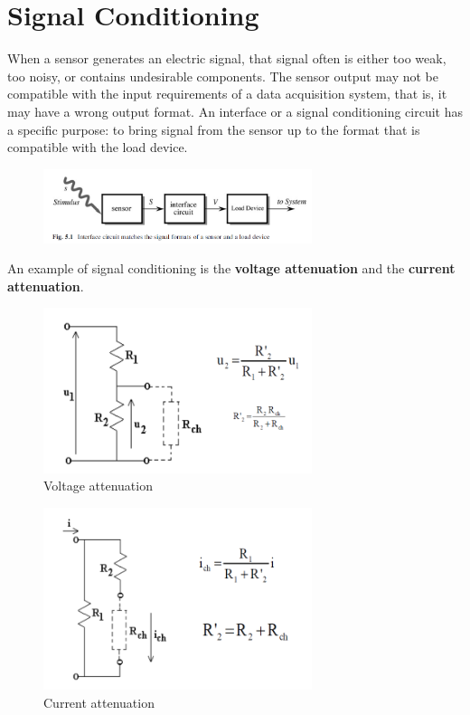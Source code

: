 \section{Signal Conditioning}

When a sensor generates an electric signal, that
signal often is either too weak, too noisy, or contains undesirable components. The sensor output may not be compatible with the input requirements of a
data acquisition system, that is, it may have a wrong output format. An interface or a signal conditioning circuit has a specific purpose: to bring
signal from the sensor up to the format that is compatible with the load device.

\begin{figure}[H]
    \centering
    \includegraphics[width = 0.7\textwidth]{L4/img/interface.PNG}
\end{figure}

An example of signal conditioning is the \textbf{voltage attenuation} and the \textbf{current attenuation}.

\begin{minipage}[c]{.45\linewidth}	  
\begin{figure}[H]
    \centering
    \includegraphics[width = 0.7\textwidth]{L4/img/voltage.PNG}
    \caption{Voltage attenuation}
\end{figure}
\end{minipage} \hfill
\begin{minipage}[c]{.45\linewidth}
   \begin{figure}[H]
    \centering
    \includegraphics[width = 0.7\textwidth]{L4/img/current.PNG}
    \caption{Current attenuation}
\end{figure}
\end{minipage}

